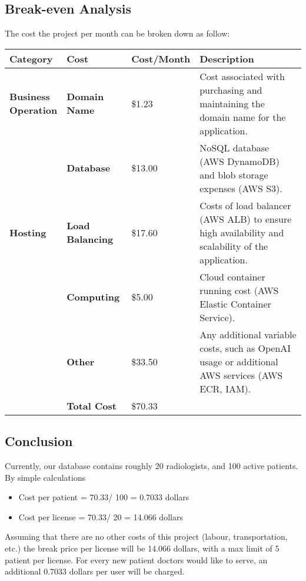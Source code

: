 \documentclass{article}
\begin{document}
\subsection{Break-even Analysis}
The cost the project per month can be broken down as follow:
\begin{longtable}{| p{} | p{} | p{} | p{}|}
    \hline
    \textbf{Category} & \textbf{Cost} & \textbf{Cost/Month} & \textbf{Description} \\
    \hline

    \multirow{1}{*}{\parbox{0.15\textwidth}{\textbf{Business\\Operation}}}
    & \textbf{Domain Name} & \$1.23 & Cost associated with purchasing and maintaining the domain name for the application. \\
    \hline 

    \multirow{3}{*}{\textbf{Hosting}} 
    & \textbf{Database} & \$13.00 & NoSQL database (AWS DynamoDB) and blob storage expenses (AWS S3). \\
    \cline{2-4}
    & \textbf{Load Balancing} & \$17.60 & Costs of load balancer (AWS ALB) to ensure high availability and scalability of the application. \\
    \cline{2-4}
    & \textbf{Computing} & \$5.00 & Cloud container running cost (AWS Elastic Container Service). \\
    \cline{2-4}
    & \textbf{Other} & \$33.50 & Any additional variable costs, such as OpenAI usage or additional AWS services (AWS ECR, IAM). \\ 
    \hline
    
    & \textbf{Total Cost} & \$70.33 & \\
    \hline
\end{longtable}

\subsection{Conclusion}
Currently, our database contains roughly 20 radiologists, and 100 active patients. By simple calculations
\begin{itemize}
    \item Cost per patient = 70.33/ 100 = 0.7033 dollars
    \item Cost per license = 70.33/ 20 = 14.066 dollars
\end{itemize}
Assuming that there are no other costs of this project (labour, transportation, etc.) the break price per license will be 14.066 dollars, with a max limit of 5 patient per license. For every new patient doctors would like to serve, an additional 0.7033 dollars per user will be charged.
\end{document}
